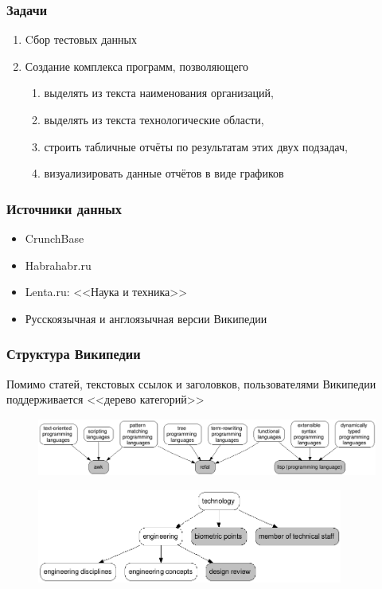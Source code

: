 \documentclass{beamer}
\begin{document}
\begin{frame}\frametitle{Задачи}

\begin{enumerate}
    \item Cбор тестовых данных
    \item Создание комплекса программ, позволяющего 
        \begin{enumerate}
            \item выделять из текста наименования организаций,
            \item выделять из текста технологические области,
            \item строить табличные отчёты по результатам этих двух подзадач,
            \item визуализировать данные отчётов в виде графиков
        \end{enumerate}
\end{enumerate}
\end{frame}

\begin{frame}\frametitle{Источники данных}

\begin{itemize}
    \item CrunchBase
    \item Habrahabr.ru
    \item Lenta.ru: <<Наука и техника>>
    \item Русскоязычная и англоязычная версии Википедии
\end{itemize}
\end{frame}

\begin{frame}\frametitle{Структура Википедии}
Помимо статей, текстовых ссылок и заголовков, пользователями Википедии поддерживается <<дерево категорий>>

\begin{figure}[ht]
\begin{center}
\includegraphics[height=0.75in]{chart_languages.png}
\end{center}
\end{figure}

\begin{figure}[ht]
\begin{center}
\includegraphics[height=1.2in]{chart_categories.png}
\end{center}
\end{figure}
\end{frame}
\end{document}
